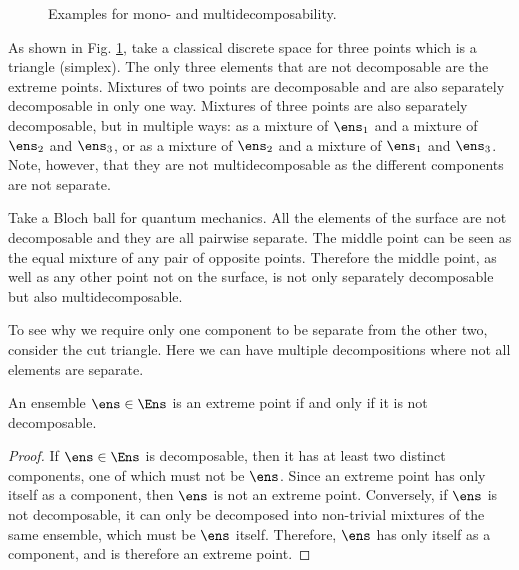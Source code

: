 \begin{mathSection}
\begin{figure}[H]
	\caption{Examples for mono- and multidecomposability.}\label{pm-es-fig-monodecomposability}
\end{figure}

\begin{remark}
	As shown in Fig. \ref{pm-es-fig-monodecomposability}, take a classical discrete space for three points which is a triangle (simplex). The only three elements that are not decomposable are the extreme points. Mixtures of two points are decomposable and are also separately decomposable in only one way. Mixtures of three points are also separately decomposable, but in multiple ways: as a mixture of $\ens_1$ and a mixture of $\ens_2$ and $\ens_3$, or as a mixture of $\ens_2$ and a mixture of $\ens_1$ and $\ens_3$. Note, however, that they are not multidecomposable as the different components are not separate.
	
	Take a Bloch ball for quantum mechanics. All the elements of the surface are not decomposable and they are all pairwise separate. The middle point can be seen as the equal mixture of any pair of opposite points. Therefore the middle point, as well as any other point not on the surface, is not only separately decomposable but also multidecomposable.
	
	To see why we require only one component to be separate from the other two, consider the cut triangle. Here we can have multiple decompositions where not all elements are separate.
\end{remark}

\begin{coro}
	An ensemble $\ens \in \Ens$ is an extreme point if and only if it is not decomposable.
\end{coro}

\begin{proof}
	If $\ens \in \Ens$ is decomposable, then it has at least two distinct components, one of which must not be $\ens$. Since an extreme point has only itself as a component, then $\ens$ is not an extreme point. Conversely, if $\ens$ is not decomposable, it can only be decomposed into non-trivial mixtures of the same ensemble, which must be $\ens$ itself. Therefore, $\ens$ has only itself as a component, and is therefore an extreme point.
\end{proof}


\end{mathSection}
